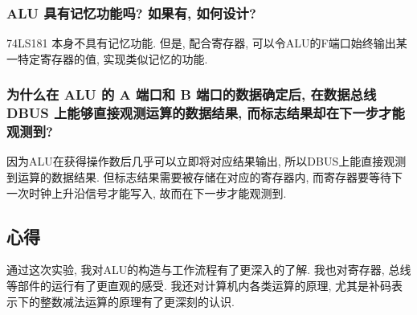 \documentclass[../main.tex]{subfiles}
\begin{document}
\subsubsection{ALU 具有记忆功能吗? 如果有, 如何设计?}

74LS181 本身不具有记忆功能. 但是, 配合寄存器, 可以令ALU的F端口始终输出某一特定寄存器的值, 实现类似记忆的功能.

\subsubsection{为什么在 ALU 的 A 端口和 B 端口的数据确定后, 在数据总线 DBUS 上能够直接观测运算的数据结果, 而标志结果却在下一步才能观测到?}

因为ALU在获得操作数后几乎可以立即将对应结果输出, 所以DBUS上能直接观测到运算的数据结果.
但标志结果需要被存储在对应的寄存器内, 而寄存器要等待下一次时钟上升沿信号才能写入, 故而在下一步才能观测到.

\subsection{心得}

通过这次实验, 我对ALU的构造与工作流程有了更深入的了解.
我也对寄存器, 总线等部件的运行有了更直观的感受.
我还对计算机内各类运算的原理, 尤其是补码表示下的整数减法运算的原理有了更深刻的认识.
\end{document}
